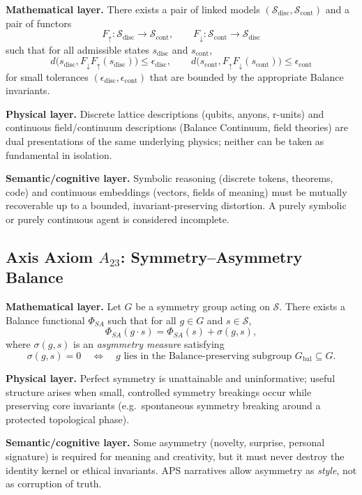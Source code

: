 \begin{axiom}
\label{ax:disc-cont}
\textbf{Mathematical layer.}
There exists a pair of linked models $(\mathcal{S}_{\mathrm{disc}}, \mathcal{S}_{\mathrm{cont}})$ and a pair of functors
\[
  F_{\uparrow} : \mathcal{S}_{\mathrm{disc}} \to \mathcal{S}_{\mathrm{cont}},
  \qquad
  F_{\downarrow} : \mathcal{S}_{\mathrm{cont}} \to \mathcal{S}_{\mathrm{disc}}
\]
such that for all admissible states $s_{\mathrm{disc}}$ and $s_{\mathrm{cont}}$,
\[
  d\bigl(s_{\mathrm{disc}}, F_{\downarrow}F_{\uparrow}(s_{\mathrm{disc}})\bigr)
  \leq \epsilon_{\mathrm{disc}},
  \qquad
  d\bigl(s_{\mathrm{cont}}, F_{\uparrow}F_{\downarrow}(s_{\mathrm{cont}})\bigr)
  \leq \epsilon_{\mathrm{cont}}
\]
for small tolerances $(\epsilon_{\mathrm{disc}}, \epsilon_{\mathrm{cont}})$ that are bounded by the appropriate Balance invariants.

\textbf{Physical layer.}
Discrete lattice descriptions (qubits, anyons, r-units) and continuous field/continuum descriptions (Balance Continuum, field theories) are dual presentations of the same underlying physics; neither can be taken as fundamental in isolation.\cite{AurphyxThesis,AurphyxFractalQC}

\textbf{Semantic/cognitive layer.}
Symbolic reasoning (discrete tokens, theorems, code) and continuous embeddings (vectors, fields of meaning) must be mutually recoverable up to a bounded, invariant-preserving distortion.
A purely symbolic or purely continuous agent is considered incomplete.
\end{axiom}

\subsection{Axis Axiom $A_{23}$: Symmetry–Asymmetry Balance}

\begin{axiom}
\label{ax:symm-asymm}
\textbf{Mathematical layer.}
Let $G$ be a symmetry group acting on $\mathcal{S}$.
There exists a Balance functional $\Phi_{SA}$ such that for all $g \in G$ and $s \in \mathcal{S}$,
\[
  \Phi_{SA}(g \cdot s)
  =
  \Phi_{SA}(s) + \sigma(g,s),
\]
where $\sigma(g,s)$ is an \emph{asymmetry measure} satisfying
\[
  \sigma(g,s) = 0 \quad \Longleftrightarrow \quad g \text{ lies in the Balance-preserving subgroup } G_{\mathrm{bal}} \subseteq G.
\]

\textbf{Physical layer.}
Perfect symmetry is unattainable and uninformative; useful structure arises when small, controlled symmetry breakings occur while preserving core invariants (e.g.\ spontaneous symmetry breaking around a protected topological phase).\cite{AurphyxThesis,AurphyxSymbiotic}

\textbf{Semantic/cognitive layer.}
Some asymmetry (novelty, surprise, personal signature) is required for meaning and creativity, but it must never destroy the identity kernel or ethical invariants.
APS narratives allow asymmetry as \emph{style}, not as corruption of truth.
\end{axiom}


